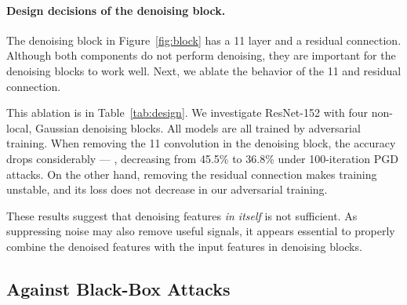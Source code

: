 \documentclass[10pt,twocolumn,letterpaper]{article}
\begin{document}
\renewcommand\arraystretch{1.02}
\setlength{\tabcolsep}{12pt}
\begin{table}[t]
\centering
{}
\vspace{.5em}
\caption{\textbf{Ablation: denoising block design} for defending against \emph{white-box} attacks on ImageNet. Our networks have four (Gaussian) non-local means denoising blocks. We indicate the performance of models we were unable to train by ``NaN''. 
}
\label{tab:design}
\vspace{-.5em}
\end{table}


\paragraph{Design decisions of the denoising block.} The denoising block in Figure~\ref{fig:block} has a 11 layer and a residual connection. Although both components do not perform denoising, they are important for the denoising blocks to work well. Next, we ablate the behavior of the 11 and residual connection.

This ablation is in Table~\ref{tab:design}.
We investigate ResNet-152 with four non-local, Gaussian denoising blocks.
All models are all trained by adversarial training.
When removing the 11 convolution in the denoising block, the accuracy drops considerably --- \eg, decreasing from 45.5\% to 36.8\% under 100-iteration PGD attacks.
On the other hand, removing the residual connection makes training unstable, and its loss does not decrease in our adversarial training.

These results suggest that denoising features \emph{in itself} is not sufficient. As suppressing noise may also remove useful signals, it appears essential to properly combine the denoised features with the input features in denoising blocks.

\subsection{Against Black-Box Attacks} 
\end{document}

